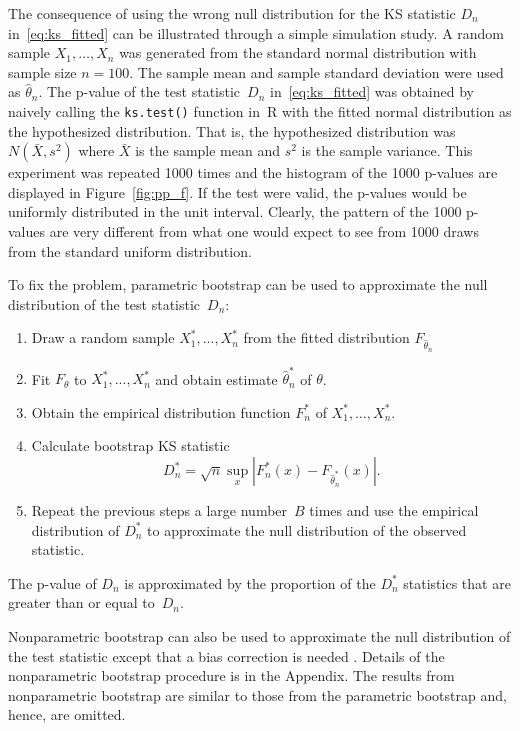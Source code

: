 \documentclass[12pt, letterpaper, titlepage]{article}
\begin{document}
The consequence of using the wrong null distribution for the KS statistic $D_n$
in~\eqref{eq:ks_fitted} can be illustrated through a simple simulation study. A
random sample $X_1, \ldots, X_n$ was generated from the standard normal
distribution with sample size $n = 100$. The sample mean and sample standard
deviation were used as $\hat\theta_n$. The p-value of the test
statistic~$D_n$ in~\eqref{eq:ks_fitted} was obtained by naively calling the
\texttt{ks.test()} function in~R with the fitted normal distribution as the
hypothesized distribution. That is, the hypothesized distribution was
$N(\bar X, s^2)$ where $\bar X$ is the sample mean and $s^2$ is the sample
variance. This experiment was repeated 1000 times and the histogram of the
1000 p-values are displayed in Figure~\ref{fig:pp_f}. If the test were
valid, the p-values would be uniformly distributed in the unit
interval. Clearly, the pattern of the 1000 p-values are very different from what
one would expect to see from 1000 draws from the standard uniform
distribution.


To fix the problem, parametric bootstrap can be used to approximate the null
distribution of the test statistic~$D_n$:
\begin{enumerate}
\item
  Draw a random sample $X_1^*,...,X_n^*$ from the fitted distribution
  $F_{\hat\theta_n}$
\item
  Fit $F_\theta$ to $X_1^*,...,X_n^*$ and obtain estimate 
	$\hat\theta_n^*$ of $\theta$.
\item
  Obtain the empirical distribution function $F_n^*$ of
  $X_1^*, \ldots,  X_n^*$.
\item
  Calculate bootstrap KS statistic
  \[
    D_n^* = \sqrt{n} \sup_x | F_n^* (x)- F_{\hat\theta_n^*}(x) |.
  \]
\item
  Repeat the previous steps a large number~$B$ times and use the empirical
  distribution of $D_n^*$ to approximate the null distribution of the observed
  statistic.
\end{enumerate}
The p-value of $D_n$ is approximated by the proportion of the $D_n^*$ 
statistics that are
greater than or equal to~$D_n$.


Nonparametric bootstrap can also be used to approximate the null distribution
of the test statistic except that a bias correction is needed
\citet{babu2004goodness}. Details of the nonparametric bootstrap procedure is
in the Appendix. The results from nonparametric bootstrap are similar to those
from the parametric bootstrap and, hence, are omitted.
\end{document}
